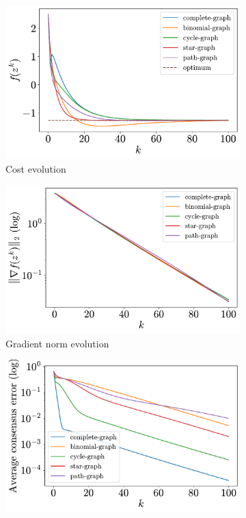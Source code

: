 \documentclass[a4paper,11pt,oneside]{book}
\begin{document}
\begin{figure}[htb!]
      \centering
      \begin{subfigure}[t]{0.46\linewidth}
            \centering
            \includegraphics[width=\linewidth]{./figs/quadratic/5_3_100/cost.pdf} 
            \caption{Cost evolution}
      \end{subfigure}
      \hfill
      \begin{subfigure}[t]{0.46\linewidth}
            \centering
            \includegraphics[width=\linewidth]{./figs/quadratic/5_3_100/gradient.pdf} 
            \caption{Gradient norm evolution}
      \end{subfigure}
      \hfill
      \begin{subfigure}[t]{0.46\linewidth}
            \centering
            \includegraphics[width=\linewidth]{./figs/quadratic/5_3_100/consensus.pdf} 

\end{subfigure}
\end{figure}
\end{document}
